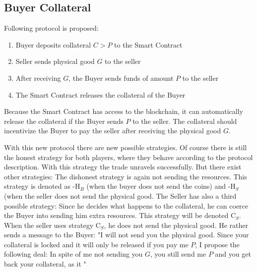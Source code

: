 \documentclass{cacthesis}
\begin{document}
\subsection{Buyer Collateral}
Following protocol is proposed:
\begin{enumerate}
    \item Buyer deposits collateral $C > P$ to the Smart Contract
    \item Seller sends physical good $G$ to the seller 
    \item After receiving $G$, the Buyer sends funds of amount $P$ to the seller 
    \item The Smart Contract releases the collateral of the Buyer
\end{enumerate}

Because the Smart Contract has access to the blockchain, it can automatically release the collateral if the Buyer sends $P$  to the seller. The collateral should incentivize the Buyer to pay the seller after receiving the physical good $G$.

With this new protocol there are new possible strategies. Of course there is still the honest strategy for both players, where they behave according to the protocol description. With this strategy the trade unravels successfully.\newline
But there exist other strategies: The dishonest strategy is again not sending the resources. This strategy is denoted as -H$_B$ (when the buyer does not send the coins) and -H$_S$ (when the seller does not send the physical good.\newline
The Seller has also a third possible strategy: Since he decides what happens to the collateral, he can coerce the Buyer into sending him extra resources. This strategy will be denoted C$_S$.  When the seller uses strategy C$_S$, he does not send the physical good. He rather sends a message to the Buyer: "I will not send you the physical good. Since your collateral is locked and it will only be released if you pay me $P$, I propose the following deal: In spite of me not sending you $G$, you still send me $P$ and you get back your collateral, as it "\newline


\end{document}
